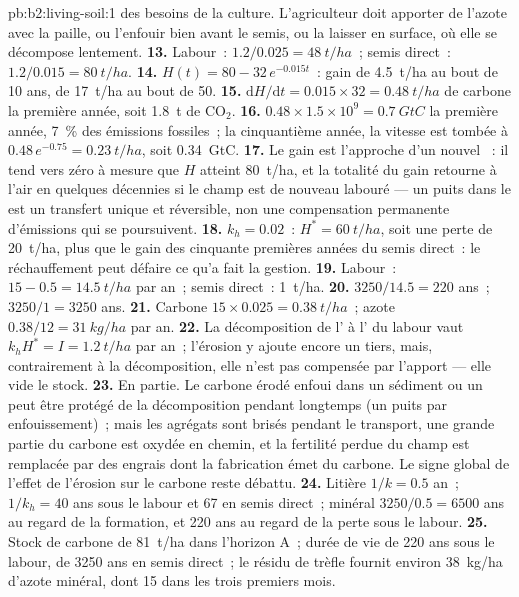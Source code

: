 \begin{solution}{pb:b2:living-soil:1}
des besoins de la culture. L'agriculteur doit apporter de l'azote avec la
paille, ou l'enfouir bien avant le semis, ou la laisser en surface, où
elle se décompose lentement.
\textbf{13.} Labour~: $1.2/0.025 = \qty{48}{t/ha}$~; semis direct~:
$1.2/0.015 = \qty{80}{t/ha}$.
\textbf{14.} $H(t) = 80 - 32\,e^{-0.015t}$~: gain de \qty{4.5}{t/ha}
au bout de 10 ans, de \qty{17}{t/ha} au bout de 50.
\textbf{15.} $\mathrm{d}H/\mathrm{d}t = 0.015\times 32 =
\qty{0.48}{t/ha}$ de carbone la première année, soit \qty{1.8}{t} de
$\mathrm{CO_2}$.
\textbf{16.} $0.48\times 1.5\times 10^{9} = \qty{0.7}{GtC}$ la
première année, \qty{7}{\%} des émissions fossiles~; la cinquantième
année, la vitesse est tombée à $0.48\,e^{-0.75} = \qty{0.23}{t/ha}$,
soit \qty{0.34}{GtC}.
\textbf{17.} Le gain est l'approche d'un nouvel ~: il
tend vers zéro à mesure que $H$ atteint \qty{80}{t/ha}, et la totalité du
gain retourne à l'air en quelques décennies si le champ est de nouveau
labouré --- un puits dans le  est un transfert unique et réversible,
non une compensation permanente d'émissions qui se poursuivent.
\textbf{18.} $k_h = 0.02$~: $H^{*} = \qty{60}{t/ha}$, soit une perte de
\qty{20}{t/ha}, plus que le gain des cinquante premières années du semis direct~: le réchauffement peut
défaire ce qu'a fait la gestion.
\textbf{19.} Labour~: $15 - 0.5 = \qty{14.5}{t/ha}$ par an~; semis
direct~: \qty{1}{t/ha}.
\textbf{20.} $3250/14.5 = 220$ ans~; $3250/1 = 3250$ ans.
\textbf{21.} Carbone $15\times 0.025 = \qty{0.38}{t/ha}$~; azote
$0.38/12 = \qty{31}{kg/ha}$ par an.
\textbf{22.} La décomposition de l' à l' du labour
vaut $k_hH^{*} =
I = \qty{1.2}{t/ha}$ par an~; l'érosion y ajoute encore un tiers, mais,
contrairement à la décomposition, elle n'est pas compensée par l'apport
--- elle vide le stock.
\textbf{23.} En partie. Le carbone érodé enfoui dans un sédiment ou un
 peut être protégé de la décomposition pendant longtemps (un
puits par enfouissement)~; mais les agrégats sont brisés pendant le
transport, une grande partie du carbone est oxydée en chemin, et la
fertilité perdue du champ est remplacée par des engrais dont la
fabrication émet du carbone. Le signe global de l'effet de l'érosion sur
le carbone reste débattu.
\textbf{24.} Litière $1/k = 0.5$ an~;  $1/k_h = 40$ ans sous le
labour et 67 en semis direct~;  minéral $3250/0.5 =
6500$ ans au regard de la formation, et 220 ans au regard de la perte
sous le labour.
\textbf{25.} Stock de carbone de \qty{81}{t/ha} dans l'horizon A~; durée
de vie de 220 ans sous le labour, de 3250 ans en semis direct~; le résidu
de trèfle fournit environ \qty{38}{kg/ha} d'azote minéral, dont 15 dans
les trois premiers mois.
\end{solution}
